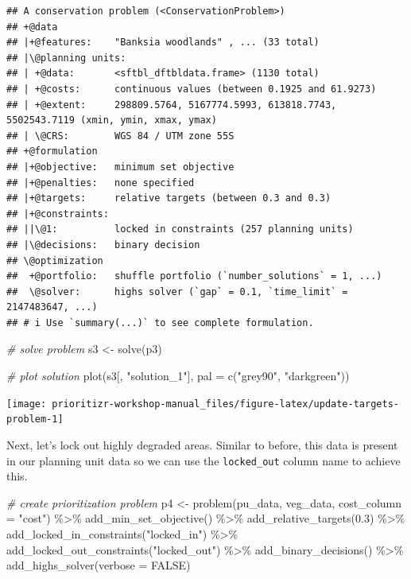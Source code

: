 \documentclass[
  12pt,
]{book}
\newenvironment{Shaded}{\begin{snugshade}}{\end{snugshade}}
\newcommand{\AttributeTok}[1]{\textcolor[rgb]{0.77,0.63,0.00}{#1}}
\newcommand{\CommentTok}[1]{\textcolor[rgb]{0.56,0.35,0.01}{\textit{#1}}}
\newcommand{\ConstantTok}[1]{\textcolor[rgb]{0.00,0.00,0.00}{#1}}
\newcommand{\FloatTok}[1]{\textcolor[rgb]{0.00,0.00,0.81}{#1}}
\newcommand{\FunctionTok}[1]{\textcolor[rgb]{0.00,0.00,0.00}{#1}}
\newcommand{\NormalTok}[1]{#1}
\newcommand{\OtherTok}[1]{\textcolor[rgb]{0.56,0.35,0.01}{#1}}
\newcommand{\SpecialCharTok}[1]{\textcolor[rgb]{0.00,0.00,0.00}{#1}}
\newcommand{\StringTok}[1]{\textcolor[rgb]{0.31,0.60,0.02}{#1}}
\begin{document}
\begin{verbatim}
## A conservation problem (<ConservationProblem>)
## +@data
## |+@features:    "Banksia woodlands" , ... (33 total)
## |\@planning units:
## | +@data:       <sftbl_dftbldata.frame> (1130 total)
## | +@costs:      continuous values (between 0.1925 and 61.9273)
## | +@extent:     298809.5764, 5167774.5993, 613818.7743, 5502543.7119 (xmin, ymin, xmax, ymax)
## | \@CRS:        WGS 84 / UTM zone 55S
## +@formulation
## |+@objective:   minimum set objective
## |+@penalties:   none specified
## |+@targets:     relative targets (between 0.3 and 0.3)
## |+@constraints:
## ||\@1:          locked in constraints (257 planning units)
## |\@decisions:   binary decision
## \@optimization
##  +@portfolio:   shuffle portfolio (`number_solutions` = 1, ...)
##  \@solver:      highs solver (`gap` = 0.1, `time_limit` = 2147483647, ...)
## # i Use `summary(...)` to see complete formulation.
\end{verbatim}

\begin{Shaded}
\begin{Highlighting}[]
\CommentTok{\# solve problem}
\NormalTok{s3 }\OtherTok{\textless{}{-}} \FunctionTok{solve}\NormalTok{(p3)}

\CommentTok{\# plot solution}
\FunctionTok{plot}\NormalTok{(s3[, }\StringTok{"solution\_1"}\NormalTok{], }\AttributeTok{pal =} \FunctionTok{c}\NormalTok{(}\StringTok{"grey90"}\NormalTok{, }\StringTok{"darkgreen"}\NormalTok{))}
\end{Highlighting}
\end{Shaded}

\begin{center}\texttt{[image: prioritizr-workshop-manual\_files/figure-latex/update-targets-problem-1]} \end{center}

\clearpage

Next, let's lock out highly degraded areas. Similar to before, this data is present in our planning unit data so we can use the \texttt{locked\_out} column name to achieve this.

\begin{Shaded}
\begin{Highlighting}[]
\CommentTok{\# create prioritization problem}
\NormalTok{p4 }\OtherTok{\textless{}{-}}
  \FunctionTok{problem}\NormalTok{(pu\_data, veg\_data, }\AttributeTok{cost\_column =} \StringTok{"cost"}\NormalTok{) }\SpecialCharTok{\%\textgreater{}\%}
  \FunctionTok{add\_min\_set\_objective}\NormalTok{() }\SpecialCharTok{\%\textgreater{}\%}
  \FunctionTok{add\_relative\_targets}\NormalTok{(}\FloatTok{0.3}\NormalTok{) }\SpecialCharTok{\%\textgreater{}\%}
  \FunctionTok{add\_locked\_in\_constraints}\NormalTok{(}\StringTok{"locked\_in"}\NormalTok{) }\SpecialCharTok{\%\textgreater{}\%}
  \FunctionTok{add\_locked\_out\_constraints}\NormalTok{(}\StringTok{"locked\_out"}\NormalTok{) }\SpecialCharTok{\%\textgreater{}\%}
  \FunctionTok{add\_binary\_decisions}\NormalTok{() }\SpecialCharTok{\%\textgreater{}\%}
  \FunctionTok{add\_highs\_solver}\NormalTok{(}\AttributeTok{verbose =} \ConstantTok{FALSE}\NormalTok{)}
\end{Highlighting}
\end{Shaded}
\end{document}
